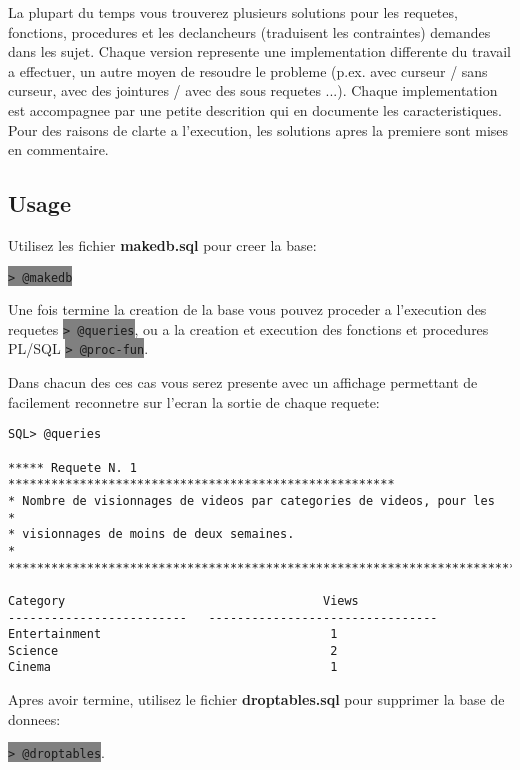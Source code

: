 \documentclass[twoside,openright,a4paper,11pt,french]{article}
\begin{document}
\bigbreak
La plupart du temps vous trouverez plusieurs solutions pour les requetes,
fonctions, procedures et les declancheurs (traduisent les contraintes) demandes
dans les sujet. Chaque version represente une implementation differente du
travail a effectuer, un autre moyen de resoudre le probleme  (p.ex. avec
curseur / sans curseur, avec des jointures / avec des sous requetes ...).
Chaque implementation est accompagnee par une petite descrition qui en
documente les caracteristiques.  Pour des raisons de clarte a l'execution, les
solutions apres la premiere sont mises en commentaire. 

\subsection{Usage}
Utilisez les fichier {\bf makedb.sql} pour creer la base:
\begin{center}
\colorbox{gray}{\lstinline[basicstyle=\ttfamily\color{black}]|> @makedb|}
\end{center}
Une fois termine la creation de la base vous pouvez proceder a l'execution des
requetes
\colorbox{gray}{\lstinline[basicstyle=\ttfamily\color{black}]|> @queries|},
ou a la creation et execution des fonctions et procedures PL/SQL
\colorbox{gray}{\lstinline[basicstyle=\ttfamily\color{black}]|> @proc-fun|}.

\smallbreak
Dans chacun des ces cas vous serez presente avec un affichage permettant de
facilement reconnetre sur l'ecran la sortie de chaque requete:

\begin{lstlisting}
SQL> @queries

***** Requete N. 1 ******************************************************
* Nombre de visionnages de videos par categories de videos, pour les            *
* visionnages de moins de deux semaines.                                        *
*************************************************************************

Category                                    Views
-------------------------   --------------------------------
Entertainment                                1
Science                                      2
Cinema                                       1
\end{lstlisting}

Apres avoir termine, utilisez le fichier {\bf droptables.sql} pour supprimer
la base de donnees:
\begin{center}
\colorbox{gray}{\lstinline[basicstyle=\ttfamily\color{black}]|> @droptables|}.
\end{center}
\end{document}
